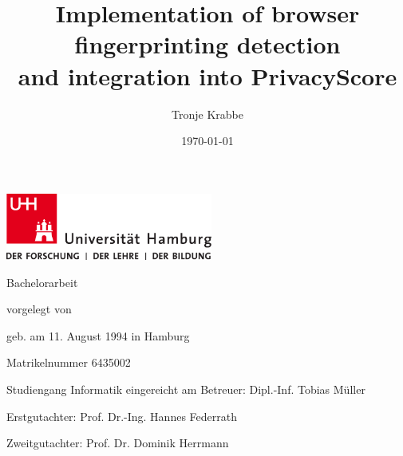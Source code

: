 \documentclass[
    fontsize=12pt,
    headings=small,
    parskip=half,
    bibliography=totoc,
    numbers=noenddot,
    open=any
    ]{scrreprt}
\title{
    Implementation of browser fingerprinting detection \\
    and integration into PrivacyScore
}
\author{Tronje Krabbe}
\date{\today}
\begin{document}
\hypersetup{hidelinks}



\newpage
\thispagestyle{empty}
\begin{titlepage}%
\includegraphics[width=6.8cm]{images/up-uhh-logo-u-2010-u-farbe-u-rgb.pdf}
\begin{center}\Large
	\vfill
	Bachelorarbeit
	\vfill
	\makeatletter
	{\Large\textsf{\textbf{\@title}}\par}
	\makeatother
	\vfill
	vorgelegt von
	\par\bigskip
	\makeatletter
	{\@author} \par
	\makeatother
	geb. am 11. August 1994 in Hamburg \par
	Matrikelnummer 6435002 \par
	Studiengang Informatik
	\vfill
	\makeatletter
	eingereicht am {\@date}
	\makeatother
	\vfill
	Betreuer: Dipl.-Inf. Tobias Müller \par
	Erstgutachter: Prof. Dr.-Ing. Hannes Federrath \par
	Zweitgutachter: Prof. Dr. Dominik Herrmann
\end{center}
\end{titlepage}%
\end{document}

